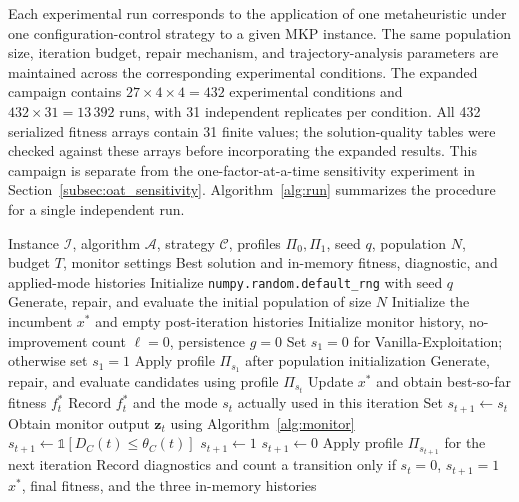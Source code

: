 \documentclass[journal,article,submit,moreauthors]{Definitions/mdpi}
\begin{document}
Each experimental run corresponds to the application of one metaheuristic under one configuration-control strategy to a given MKP instance. The same
population size, iteration budget, repair mechanism, and trajectory-analysis
parameters are maintained across the corresponding experimental conditions.
The expanded campaign contains $27\times4\times4=432$ experimental
conditions and $432\times31=13\,392$ runs, with 31 independent replicates
per condition. All 432 serialized
fitness arrays contain 31 finite values; the solution-quality tables were
checked against these arrays before incorporating the expanded results.
This campaign is separate from the one-factor-at-a-time sensitivity
experiment in Section~\ref{subsec:oat_sensitivity}.
Algorithm~\ref{alg:run} summarizes the procedure for a single independent
run.
\begin{algorithm}[p]
\caption{Single run with explicit configuration-switching rules.}
\label{alg:run}
\footnotesize
\begin{algorithmic}[1]
\Require Instance $\mathcal I$, algorithm $\mathcal A$, strategy $\mathcal C$,
profiles $\Pi_0,\Pi_1$, seed $q$, population $N$, budget $T$, monitor settings
\Ensure Best solution and in-memory fitness, diagnostic, and applied-mode histories
\State Initialize \texttt{numpy.random.default\_rng} with seed $q$
\State Generate, repair, and evaluate the initial population of size $N$
\State Initialize the incumbent $x^*$ and empty post-iteration histories
\State Initialize monitor history, no-improvement count $\ell=0$, persistence $g=0$
\State Set $s_1=0$ for Vanilla-Exploitation; otherwise set $s_1=1$
\State Apply profile $\Pi_{s_1}$ after population initialization
  \State Generate, repair, and evaluate candidates using profile $\Pi_{s_t}$
  \State Update $x^*$ and obtain best-so-far fitness $f_t^*$
  \State Record $f_t^*$ and the mode $s_t$ actually used in this iteration
  \State Set $s_{t+1}\gets s_t$
    \State Obtain monitor output $\mathbf z_t$ using Algorithm~\ref{alg:monitor}
      \State $s_{t+1}\gets\mathbb{1}[D_C(t)\leq\theta_C(t)]$
        \State $s_{t+1}\gets1$
        \State $s_{t+1}\gets0$
      \EndIf
    \EndIf
    \State Apply profile $\Pi_{s_{t+1}}$ for the next iteration
    \State Record diagnostics and count a transition only if $s_t=0$, $s_{t+1}=1$
  \EndIf
\EndFor
\State \Return $x^*$, final fitness, and the three in-memory histories
\end{algorithmic}
\end{algorithm}
\end{document}
